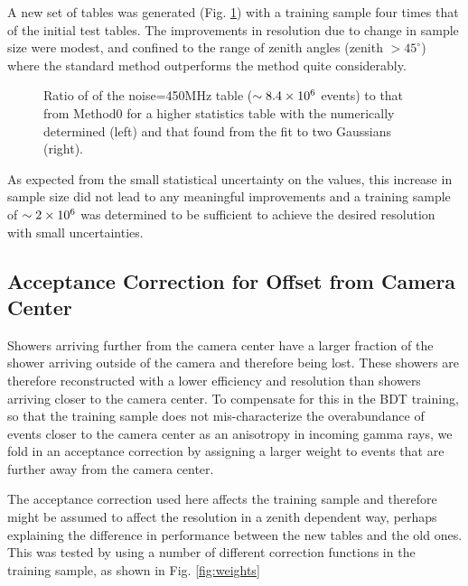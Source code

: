\documentclass[main.tex]{subfiles}
\begin{document}
A new set of \disp tables was generated (Fig. \ref{fig:disp_ratio_450x4}) with a training sample four times that of the initial test tables. The improvements in resolution due to change in sample size were modest, and confined to the range of zenith angles (zenith $>45^\circ$) where the standard method outperforms the \disp method quite considerably.

\begin{figure}[htbp]
  \centering
  \caption[Higher statistics \disp table reconstruction vs noise.]{Ratio of \rse of the noise=450MHz \disp table ($\sim 8.4\times 10^{6}$ events) to that from Method0 for a higher statistics \disp table with the numerically determined \rse (left) and that found from the fit to two Gaussians (right).}
  \label{fig:disp_ratio_450x4}
\end{figure}

As expected from the small statistical uncertainty on the \rse values, this increase in sample size did not lead to any meaningful improvements and a training sample of $\sim 2\times 10^{6}$ was determined to be sufficient to achieve the desired resolution with small uncertainties.

\subsection{Acceptance Correction for Offset from Camera Center}
Showers arriving further from the camera center have a larger fraction of the shower arriving outside of the camera and therefore being lost. These showers are therefore reconstructed with a lower efficiency and resolution than showers arriving closer to the camera center. To compensate for this in the BDT training, so that the training sample does not mis-characterize the overabundance of events closer to the camera center as an anisotropy in incoming gamma rays, we fold in an acceptance correction by assigning a larger weight to events that are further away from the camera center.

The acceptance correction used here affects the training sample and therefore might be assumed to affect the resolution in a zenith dependent way, perhaps explaining the difference in performance between the new \disp tables and the old ones. This was tested by using a number of different correction functions in the training sample, as shown in Fig. \ref{fig:weights}
\end{document}
